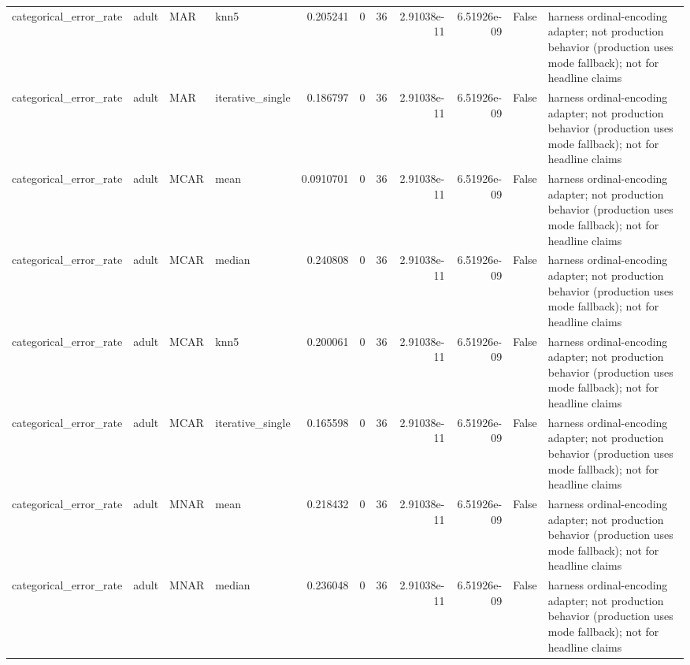 \begin{table}[ht]
\begin{tabular}{llllrrrrrll}
 categorical\_error\_rate & adult                & MAR         & knn5             &      0.205241    &                   0 &      36 & 2.91038e-11 & 6.51926e-09 & False              & harness ordinal-encoding adapter; not production behavior (production uses mode fallback); not for headline claims \\
 categorical\_error\_rate & adult                & MAR         & iterative\_single &      0.186797    &                   0 &      36 & 2.91038e-11 & 6.51926e-09 & False              & harness ordinal-encoding adapter; not production behavior (production uses mode fallback); not for headline claims \\
 categorical\_error\_rate & adult                & MCAR        & mean             &      0.0910701   &                   0 &      36 & 2.91038e-11 & 6.51926e-09 & False              & harness ordinal-encoding adapter; not production behavior (production uses mode fallback); not for headline claims \\
 categorical\_error\_rate & adult                & MCAR        & median           &      0.240808    &                   0 &      36 & 2.91038e-11 & 6.51926e-09 & False              & harness ordinal-encoding adapter; not production behavior (production uses mode fallback); not for headline claims \\
 categorical\_error\_rate & adult                & MCAR        & knn5             &      0.200061    &                   0 &      36 & 2.91038e-11 & 6.51926e-09 & False              & harness ordinal-encoding adapter; not production behavior (production uses mode fallback); not for headline claims \\
 categorical\_error\_rate & adult                & MCAR        & iterative\_single &      0.165598    &                   0 &      36 & 2.91038e-11 & 6.51926e-09 & False              & harness ordinal-encoding adapter; not production behavior (production uses mode fallback); not for headline claims \\
 categorical\_error\_rate & adult                & MNAR        & mean             &      0.218432    &                   0 &      36 & 2.91038e-11 & 6.51926e-09 & False              & harness ordinal-encoding adapter; not production behavior (production uses mode fallback); not for headline claims \\
 categorical\_error\_rate & adult                & MNAR        & median           &      0.236048    &                   0 &      36 & 2.91038e-11 & 6.51926e-09 & False              & harness ordinal-encoding adapter; not production behavior (production uses mode fallback); not for headline claims \\

\end{tabular}
\end{table}
